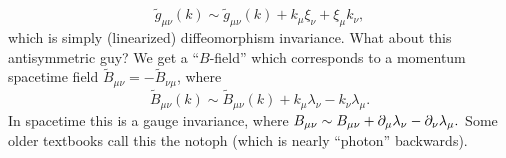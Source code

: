 \begin{equation}
    \tilde g_{\mu\nu}(k) \sim \tilde g_{\mu\nu}(k) + k_\mu \xi_\nu + \xi_\mu k_\nu,
\end{equation}
which is simply (linearized) diffeomorphism invariance. What about this antisymmetric guy? We get a ``$B$-field'' which corresponds to a momentum spacetime field $\tilde B_{\mu\nu}=-\tilde B_{\nu\mu}$, where
\begin{equation}
    \tilde B_{\mu\nu} (k) \sim \tilde B_{\mu\nu}(k)+k_\mu \lambda_\nu - k_\nu \lambda_\mu.
\end{equation}
In spacetime this is a gauge invariance, where $B_{\mu\nu}\sim B_{\mu\nu} + \partial_\mu \lambda_\nu - \partial_\nu \lambda_\mu.$ Some older textbooks call this the notoph (which is nearly ``photon'' backwards).